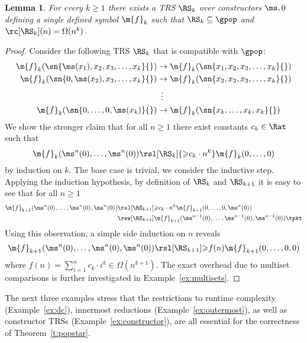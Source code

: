 \documentclass{LMCS}
\newtheorem{lemma}[thm]{Lemma}
\begin{document}
\begin{lemma}\label{l:imprecise}
  For every $k \geqslant 1$ there exists a TRS $\RS_k$ 
  over constructors $\ms,0$ defining a single defined symbol $\m{f}_k$
  such that $\RS_k \subseteq {\gpop}$ 
  and ${\rc[\RS_k](n)} = \Omega(n^k)$. 
\end{lemma}
\begin{proof}
  Consider the following TRS $\RS_k$ that is compatible with $\gpop$:
  \begin{align*}
    \m{f}_k(\sn{\ms(x_1), x_2,x_3, \dots,x_k}{}) & \to \m{f}_k(\sn{x_1, x_2, x_3, \dots,x_k}{}) \\
    \m{f}_k(\sn{0,\ms(x_2), x_3, \dots, x_k}{}) & \to \m{f}_k(\sn{x_2, x_2, x_3, \dots,x_k}{}) \\
    & \ \,\vdots \\
    \m{f}_k(\sn{0,\dots,0,\ms(x_k)}{}) & \to \m{f}_k(\sn{x_k,\dots,x_k,x_k}{})
  \end{align*}
  We show the stronger claim that for all $n \geqslant 1$ there exist constants $c_k \in \Rat$ such that 
  $$
  \m{f}_k(\ms^n(0), \dots, \ms^n(0)) 
  \rsl[\RS_k]{{\geqslant}c_k \cdot n^k} \m{f}_k(0, \dots, 0)
  $$
  by induction on $k$.
  The base case is trivial, we consider the inductive step. 
  Applying the induction hypothesis, by definition of $\RS_k$ and
  $\RS_{k+1}$ it is easy to see that for all $n \geqslant 1$
  \begin{align*}
  \m{f}_{k+1}(\ms^{n}(0), \dots, \ms^{n}(0), \ms^n(0)) 
  & \rsl[\RS_{k+1}]{{\geqslant}c_k \cdot n^k} \m{f}_{k+1}(0, \dots, 0,\ms^{n}(0)) \\
  & \rew[\RS_{k+1}]\m{f}_{k+1}(\ms^{n-1}(0),\dots,\ms^{n-1}(0),\ms^{n-1}(0)) \tpkt
  \end{align*}
  Using this observation, a simple side induction on $n$ reveals
  $$
  \m{f}_{k+1}(\ms^{n}(0), \dots, \ms^{n}(0), \ms^n(0)) 
  \rsl[\RS_{k+1}]{{\geqslant}f(n)} \m{f}_{k+1}(0, \dots, 0, 0) 
  $$
  where $f(n) = \sum_{i=1}^n c_k \cdot i^k \in \Omega(n^{k+1})$. 
The exact overhead due to multiset comparisons is further 
  investigated in Example~\ref{ex:multisets}.
\end{proof}


The next three examples stress that the restrictions to 
runtime complexity (Example~\ref{ex:dc}),
innermost reductions (Example~\ref{ex:outermost}), 
as well as constructor TRSs (Example~\ref{ex:constructor}), 
are all essential for the correctness of Theorem~\ref{t:popstar}. 
\end{document}
